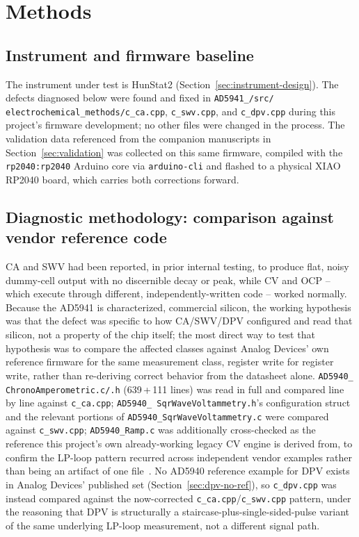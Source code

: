 \section{Methods}
\label{sec:methods}

\subsection{Instrument and firmware baseline}
The instrument under test is HunStat2 (Section~\ref{sec:instrument-design}).
The defects diagnosed below were found and fixed in
\texttt{AD5941\_/\allowbreak src/\allowbreak
electrochemical\_\allowbreak methods/\allowbreak c\_ca.cpp},
\texttt{c\_swv.cpp}, and \texttt{c\_dpv.cpp} during this project's firmware
development; no other files were changed in the process. The validation
data referenced from the companion manuscripts in
Section~\ref{sec:validation} was collected on this same firmware, compiled
with the \texttt{rp2040:rp2040} Arduino core via \texttt{arduino-cli} and
flashed to a physical XIAO RP2040 board, which carries both corrections
forward.

\subsection{Diagnostic methodology: comparison against vendor reference code}
\label{sec:diagmethod}
CA and SWV had been reported, in prior internal testing, to produce flat,
noisy dummy-cell output with no discernible decay or peak, while CV and OCP
-- which execute through different, independently-written code -- worked
normally. Because the AD5941 is characterized, commercial silicon, the
working hypothesis was that the defect was specific to how CA/SWV/DPV
configured and read that silicon, not a property of the chip itself; the
most direct way to test that hypothesis was to compare the affected classes
against Analog Devices' own reference firmware for the same measurement
class, register write for register write, rather than re-deriving correct
behavior from the datasheet alone. \texttt{AD5940\_\allowbreak
ChronoAmperometric.c/.h} (639\,+\,111 lines) was read in full and compared
line by line against \texttt{c\_ca.cpp}; \texttt{AD5940\_\allowbreak
SqrWaveVoltammetry.h}'s configuration struct and the relevant portions of
\texttt{AD5940\_\allowbreak SqrWaveVoltammetry.c} were compared against
\texttt{c\_swv.cpp}; \texttt{AD5940\_Ramp.c} was
additionally cross-checked as the reference this project's own
already-working legacy CV engine is derived from, to confirm the LP-loop
pattern recurred across independent vendor examples rather than being an
artifact of one file~\cite{ad5940_examples_github}. No AD5940 reference
example for DPV exists in Analog Devices' published set (Section~\ref{sec:dpv-no-ref}),
so \texttt{c\_dpv.cpp} was instead compared against the now-corrected
\texttt{c\_ca.cpp}/\texttt{c\_swv.cpp} pattern, under the reasoning that DPV
is structurally a staircase-plus-single-sided-pulse variant of the same
underlying LP-loop measurement, not a different signal path.

